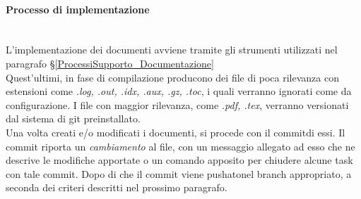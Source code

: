 
\paragraph{Processo di implementazione} \-\\
L'implementazione dei documenti avviene tramite gli strumenti utilizzati nel paragrafo §\ref{ProcessiSupporto_Documentazione}\\
Quest'ultimi, in fase di compilazione producono dei file di poca rilevanza con estensioni come \textit{.log, .out, .idx, .aux, .gz, .toc}, i quali verranno ignorati come da configurazione. I file con maggior rilevanza, come \textit{.pdf, .tex}, verranno versionati dal sistema di git preinstallato. \\
Una volta creati e/o modificati i documenti, si procede con il commit\glossario di essi. Il commit riporta un \textit{cambiamento} al file, con un messaggio allegato ad esso che ne 
descrive le modifiche apportate o un comando apposito per chiudere alcune task con tale commit. Dopo di che il commit viene pushato\glossario nel branch appropriato, a seconda dei criteri descritti nel prossimo paragrafo. 


